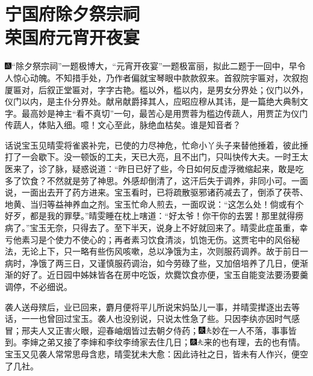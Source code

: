 

\chapter{宁国府除夕祭宗祠\\荣国府元宵开夜宴}

{\includegraphics[width=3mm]{../Images/00005}``除夕祭宗祠''一题极博大，``元宵开夜宴''一题极富丽，拟此二题于一回中，早令人惊心动魄。不知措手处，乃作者偏就宝琴眼中款款叙来。首叙院宇匾对，次叙抱厦匾对，后叙正堂匾对，字字古艳。槛以外，槛以内，是男女分界处；仪门以外，仪门以内，是主仆分界处。献帛献爵择其人，应昭应穆从其讳，是一篇绝大典制文字。最高妙是神主``看不真切''一句，最苦心是用贾蓉为槛边传蔬人，用贾芷为仪门传蔬人，体贴入细。噫！文心至此，脉绝血枯矣。谁是知音者？}

话说宝玉见晴雯将雀裘补完，已使的力尽神危，忙命小丫头子来替他捶着，彼此捶打了一会歇下。没一顿饭的工夫，天已大亮，且不出门，只叫快传大夫。一时王太医来了，诊了脉，疑惑说道：``昨日已好了些，今日如何反虚浮微缩起来，敢是吃多了饮食？不然就是劳了神思。外感却倒清了，这汗后失于调养，非同小可。一面说，一面出去开了药方进来。宝玉看时，已将疏散驱邪诸药减去了，倒添了茯苓、地黄、当归等益神养血之剂。宝玉忙命人煎去，一面叹说：``这怎么处！倘或有个好歹，都是我的罪孽。''晴雯睡在枕上嗐道：``好太爷！你干你的去罢！那里就得痨病了。''宝玉无奈，只得去了。至下半天，说身上不好就回来了。晴雯此症虽重，幸亏他素习是个使力不使心的；再者素习饮食清淡，饥饱无伤。这贾宅中的风俗秘法，无论上下，只一略有些伤风咳嗽，总以净饿为主，次则服药调养。故于前日一病时，净饿了两三日，又谨慎服药调治，如今劳碌了些，又加倍培养了几日，便渐渐的好了。近日园中姊妹皆各在房中吃饭，炊爨饮食亦便，宝玉自能变法要汤要羹调停，不必细说。

袭人送母殡后，业已回来，麝月便将平儿所说宋妈坠儿一事，并晴雯撵逐出去等话，一一也曾回过宝玉。袭人也没别说，只说太性急了些。只因李纨亦因时气感冒；邢夫人又正害火眼，迎春岫烟皆过去朝夕侍药；{\includegraphics[width=3mm]{../Images/00004}\includegraphics[width=3mm]{../Images/00012}\footnotesize \kaishu 妙在一人不落，事事皆到。}李婶之弟又接了李婶和李纹李绮家去住几日；{\includegraphics[width=3mm]{../Images/00004}\includegraphics[width=3mm]{../Images/00012}\footnotesize \kaishu 来的也有理，去的也有情。}宝玉又见袭人常常思母含悲，晴雯犹未大愈：因此诗社之日，皆未有人作兴，便空了几社。

